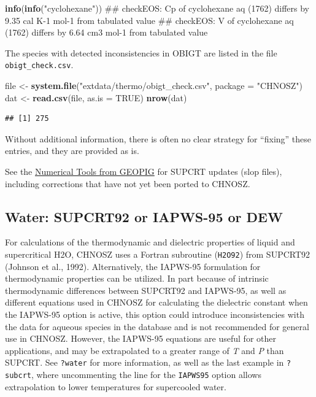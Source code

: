 \documentclass[]{tufte-handout}
\newenvironment{Shaded}{}{}
\newcommand{\KeywordTok}[1]{\textcolor[rgb]{0.00,0.44,0.13}{\textbf{#1}}}
\newcommand{\DataTypeTok}[1]{\textcolor[rgb]{0.56,0.13,0.00}{#1}}
\newcommand{\StringTok}[1]{\textcolor[rgb]{0.25,0.44,0.63}{#1}}
\newcommand{\OtherTok}[1]{\textcolor[rgb]{0.00,0.44,0.13}{#1}}
\newcommand{\NormalTok}[1]{#1}
\begin{document}
\begin{Shaded}
\begin{Highlighting}[]
\KeywordTok{info}\NormalTok{(}\KeywordTok{info}\NormalTok{(}\StringTok{"cyclohexane"}\NormalTok{))}
\NormalTok{## checkEOS: Cp of cyclohexane aq (1762) differs by 9.35 cal K-1 mol-1 from tabulated value}
\NormalTok{## checkEOS: V of cyclohexane aq (1762) differs by 6.64 cm3 mol-1 from tabulated value}
\end{Highlighting}
\end{Shaded}

The species with detected inconsistencies in OBIGT are listed in the
file \texttt{obigt\_check.csv}.

\begin{Shaded}
\begin{Highlighting}[]
\NormalTok{file <-}\StringTok{ }\KeywordTok{system.file}\NormalTok{(}\StringTok{"extdata/thermo/obigt_check.csv"}\NormalTok{, }\DataTypeTok{package =} \StringTok{"CHNOSZ"}\NormalTok{)}
\NormalTok{dat <-}\StringTok{ }\KeywordTok{read.csv}\NormalTok{(file, }\DataTypeTok{as.is =} \OtherTok{TRUE}\NormalTok{)}
\KeywordTok{nrow}\NormalTok{(dat)}
\end{Highlighting}
\end{Shaded}

\begin{verbatim}
## [1] 275
\end{verbatim}

Without additional information, there is often no clear strategy for
``fixing'' these entries, and they are provided as is.

\begin{marginfigure}
See the \href{http://geopig.asu.edu/?q=tools}{Numerical Tools from
GEOPIG} for SUPCRT updates (slop files), including corrections that have
not yet been ported to CHNOSZ.
\end{marginfigure}

\subsection{Water: SUPCRT92 or IAPWS-95 or
DEW}\label{water-supcrt92-or-iapws-95-or-dew}

For calculations of the thermodynamic and dielectric properties of
liquid and supercritical H2O, CHNOSZ uses a Fortran subroutine
(\texttt{H2O92}) from SUPCRT92 (Johnson et al., 1992). Alternatively,
the IAPWS-95 formulation for thermodynamic properties \citep{WP02} can
be utilized. In part because of intrinsic thermodynamic differences
between SUPCRT92 and IAPWS-95, as well as different equations used in
CHNOSZ for calculating the dielectric constant when the IAPWS-95 option
is active, this option could introduce inconsistencies with the data for
aqueous species in the database and is not recommended for general use
in CHNOSZ. However, the IAPWS-95 equations are useful for other
applications, and may be extrapolated to a greater range of \emph{T} and
\emph{P} than SUPCRT. See {\texttt{?water}} for more information, as
well as the last example in {\texttt{?subcrt}}, where uncommenting the
line for the \texttt{IAPWS95} option allows extrapolation to lower
temperatures for supercooled water.
\end{document}
